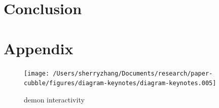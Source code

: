 \documentclass[
]{jss}
\begin{document}
\hypertarget{conclusion}{%
\section{Conclusion}\label{conclusion}}

\hypertarget{appendix}{%
\section{Appendix}\label{appendix}}

\begin{CodeChunk}
\begin{figure}

{\centering \texttt{[image: /Users/sherryzhang/Documents/research/paper-cubble/figures/diagram-keynotes/diagram-keynotes.005]} 

}

\caption[demon interactivity]{demon interactivity}\label{fig:illu-interactive-2}
\end{figure}
\end{CodeChunk}


\end{document}

